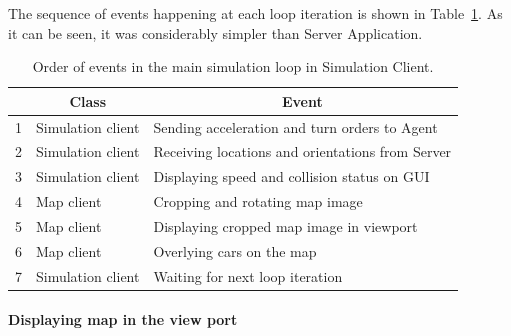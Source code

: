 \documentclass[11pt,english]{article}
\begin{document}
The sequence of events happening at each loop iteration is shown in Table~\ref{table:clients_events}. As it can be seen, it was considerably simpler than Server Application. 

\begin{table}[!]
\centering
\begin{tabular}{|l|l|l|}
\hline
\multicolumn{1}{|c|}{\textbf{}} & \multicolumn{1}{c|}{\textbf{Class}} & \multicolumn{1}{c|}{\textbf{Event}}              \\ \hline
1                               & Simulation client                   & Sending acceleration and turn orders to Agent    \\ \hline
2                               & Simulation client                   & Receiving locations and orientations from Server \\ \hline
3                               & Simulation client                   & Displaying speed and collision status on GUI     \\ \hline
4                               & Map client                          & Cropping and rotating map image                  \\ \hline
5                               & Map client                          & Displaying cropped map image in viewport         \\ \hline
6                               & Map client                          & Overlying cars on the map                        \\ \hline
7                               & Simulation client                   & Waiting for next loop iteration                  \\ \hline
\end{tabular}
\caption{Order of events in the main simulation loop in Simulation Client.}
\label{table:clients_events}
\end{table}


\paragraph{Displaying map in the view port}
\end{document}
